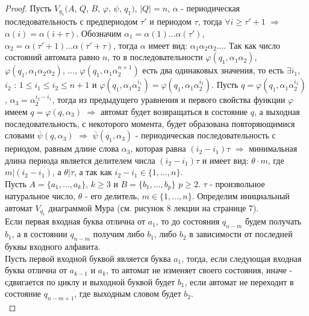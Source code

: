 \documentclass[a4paper, 12pt]{article}
\renewcommand{\phi}{\varphi}
\theoremstyle{definition}
\theoremstyle{plain}
\theoremstyle{remark}
\begin{document}
  \begin{proof}
    Пусть $V_{q_1}(A$, $Q$, $B$, $\phi$, $\psi$, $q_1)$, $|Q|=n$, $\alpha$ - периодическая последовательность с предпериодом $\tau'$ и периодом $\tau$, тогда $\forall i\geqslant\tau'+1$ $\Longrightarrow$ $\alpha(i)=\alpha(i+\tau)$. Обозначим $\alpha_1=\alpha(1)\ldots\alpha(\tau')$, $\alpha_2=\alpha(\tau'+1)\ldots\alpha(\tau'+\tau)$, тогда $\alpha$ имеет вид: $\alpha_1\alpha_2\alpha_2\ldots$. Так как число состояний автомата равно $n$, то в последовательности $\phi(q_1, \alpha_1\alpha_2)$, $\phi(q_1, \alpha_1\alpha_2\alpha_2)$, $\ldots$, $\phi(q_1,\alpha_1\alpha_2^{n+1})$ есть два одинаковых значения, то есть $\exists i_1$, $i_2$ : $1\leqslant i_1\leq i_2\leqslant n+1$ и $\phi(q_1,\alpha_1\alpha_2^{i_1})=\phi(q_1,\alpha_1\alpha_2^{i_2})$. Пусть $q=\phi(q_1,\alpha_1\alpha_2^{i_1})$, $\alpha_3=\alpha_2^{i_2-i_1}$, тогда из предыдущего уравнения и первого свойства функции $\phi$ имеем $q=\phi(q,\alpha_3)$ $\Longrightarrow$ автомат будет возвращаться в состояние $q$, а выходная последовательность, с некоторого момента, будет образована повторяющимися словами $\overline{\psi}(q,\alpha_3)$ $\Longrightarrow$ $\overline{\psi}(q_1,\alpha_3)$ - периодическая последовательность с периодом, равным длине слова $\alpha_3$, которая равна $(i_2-i_1)\tau$ $\Longrightarrow$ минимальная длина периода является делителем числа $(i_2-i_1)\tau$ и имеет вид: $\theta\cdot m$, где $m|(i_2-i_1)$, а $\theta|\tau$, а так как $i_2-i_1\in\{1,\ldots,n\}$.\\
    Пусть $A=\{a_1,\ldots,a_k\}$, $k\geqslant3$ и $B=\{b_1,\ldots,b_p\}$ $p\geqslant2$. $\tau$ - произвольное натуральное число, $\theta$ - его делитель, $m\in \{1,\ldots,n\}$. Определим инициальный автомат $V_{q_1}$ диаграммой Мура (см. рисунок 8 лекции на странице 7).\\
    Если первая входная буква отлична от $a_1$, то до состояния $q_{n-m}$ будем получать $b_1$, а в состоянии $q_{n-m}$ получим либо $b_1$, либо $b_2$ в зависимости от последней буквы входного алфавита.\\
    Пусть первой входной буквой является буква $a_1$, тогда, если следующая входная буква отлична от $a_{k-1}$ и $a_k$, то автомат не изменяет своего состояния, иначе - сдвигается по циклу и выходной буквой будет $b_1$, если автомат не переходит в состояние $q_{n-m+1}$, где выходным словом будет $b_2$.\\

\end{proof}
\end{document}
